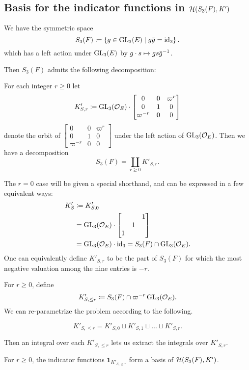 \subsection{Basis for the indicator functions in $\mathcal H(S_3(F), K')$}
We have the symmetric space
\[ S_3(F) \coloneqq \left\{ g \in \operatorname{GL}_3(E) \mid g \bar{g} = \operatorname{id}_3 \right\}. \]
which has a left action under $\operatorname{GL}_3(E)$ by $g \cdot s \mapsto gs\bar{g}^{-1}$.

Then $S_3(F)$ admits the following decomposition:
\begin{lemma}
  For each integer $r \ge 0$ let
  \[ K'_{S,r} \coloneqq \operatorname{GL}_3(\mathcal O_E) \cdot \begin{bmatrix} 0 & 0 & \varpi^r \\ 0 & 1 & 0 \\ \varpi^{-r} & 0 & 0 \end{bmatrix} \]
  denote the orbit of
  $\begin{bmatrix} 0 & 0 & \varpi^r \\ 0 & 1 & 0 \\ \varpi^{-r} & 0 & 0 \end{bmatrix}$
  under the left action of $\operatorname{GL}_3(\mathcal O_E)$.
  Then we have a decomposition
  \[ S_3(F) = \coprod_{r \geq 0} K'_{S,r}. \]
\end{lemma}
The $r=0$ case will be given a special shorthand,
and can be expressed in a few equivalent ways:
\begin{align*}
  K'_S
  &\coloneqq K'_{S,0} \\
  &= \operatorname{GL}_3(\mathcal O_E) \cdot \begin{bmatrix} & & 1 \\ & 1 \\ 1 \end{bmatrix} \\
  &= \operatorname{GL}_3(\mathcal O_E) \cdot \operatorname{id}_3 = S_3(F) \cap \operatorname{GL}_3(\mathcal O_E).
\end{align*}
One can equivalently define $K'_{S,r}$ to be the part of $S_3(F)$
for which the most negative valuation among the nine entries is $-r$.

For $r \geq 0$, define
\[ K'_{S, \le r} \coloneqq S_3(F) \cap \varpi^{-r} \operatorname{GL}_3(\mathcal O_E). \]
We can re-parametrize the problem according to the following.
\begin{proposition}
  \[ K'_{S, \le r} = K'_{S,0} \sqcup K'_{S,1} \sqcup \dots \sqcup K'_{S,r}. \]
\end{proposition}
Then an integral over each $K'_{S, \le r}$ lets us extract the integrals over $K'_{S,r}$.
\begin{proposition}
  For $r \ge 0$, the indicator functions $\mathbf{1}_{K'_{S, \le r}}$
  form a basis of $\mathcal H(S_3(F), K')$.
\end{proposition}

